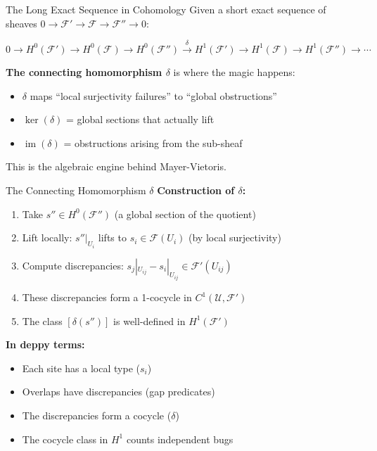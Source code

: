 \documentclass[aspectratio=169,10pt]{beamer}
\newcommand{\Fscr}{\mathcal{F}}
\newcommand{\Uscr}{\mathcal{U}}
\newcommand{\im}{\operatorname{im}}
\begin{document}
\begin{frame}{The Long Exact Sequence in Cohomology}
Given a short exact sequence of sheaves $0 \to \Fscr' \to \Fscr \to \Fscr'' \to 0$:

\[
0 \to H^0(\Fscr') \to H^0(\Fscr) \to H^0(\Fscr'') \xrightarrow{\delta} H^1(\Fscr') \to H^1(\Fscr) \to H^1(\Fscr'') \to \cdots
\]

\textbf{The connecting homomorphism $\delta$} is where the magic happens:
\begin{itemize}
  \item $\delta$ maps ``local surjectivity failures'' to ``global obstructions''
  \item $\ker(\delta)$ = global sections that actually lift
  \item $\im(\delta)$ = obstructions arising from the sub-sheaf
\end{itemize}

This is the algebraic engine behind Mayer-Vietoris.
\end{frame}

\begin{frame}{The Connecting Homomorphism $\delta$}
\textbf{Construction of $\delta$:}
\begin{enumerate}
  \item Take $s'' \in H^0(\Fscr'')$ (a global section of the quotient)
  \item Lift locally: $s''|_{U_i}$ lifts to $s_i \in \Fscr(U_i)$ (by local surjectivity)
  \item Compute discrepancies: $s_j|_{U_{ij}} - s_i|_{U_{ij}} \in \Fscr'(U_{ij})$
  \item These discrepancies form a 1-cocycle in $C^1(\Uscr, \Fscr')$
  \item The class $[\delta(s'')]$ is well-defined in $H^1(\Fscr')$
\end{enumerate}

\vspace{0.3em}
\textbf{In deppy terms:}
\begin{itemize}
  \item Each site has a local type ($s_i$)
  \item Overlaps have discrepancies (gap predicates)
  \item The discrepancies form a cocycle ($\delta$)
  \item The cocycle class in $H^1$ counts independent bugs
\end{itemize}
\end{frame}
\end{document}
